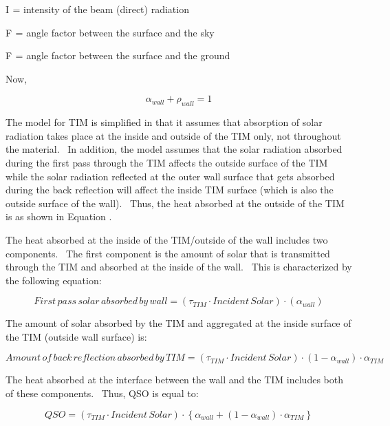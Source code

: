 I\(_{ }\) = intensity of the beam (direct) radiation

F\(_{ }\) = angle factor between the surface and the sky

F\(_{ }\) = angle factor between the surface and the ground

Now,

\begin{equation}
{\alpha_{wall}} + {\rho_{wall}} = 1
\end{equation}

The model for TIM is simplified in that it assumes that absorption of solar radiation takes place at the inside and outside of the TIM only, not throughout the material.~ In addition, the model assumes that the solar radiation absorbed during the first pass through the TIM affects the outside surface of the TIM while the solar radiation reflected at the outer wall surface that gets absorbed during the back reflection will affect the inside TIM surface (which is also the outside surface of the wall).~ Thus, the heat absorbed at the outside of the TIM is as shown in Equation .

The heat absorbed at the inside of the TIM/outside of the wall includes two components.~ The first component is the amount of solar that is transmitted through the TIM and absorbed at the inside of the wall.~ This is characterized by the following equation:

\begin{equation}
First\,pass\,solar\,absorbed\,by\,wall = \left( {{\tau_{TIM}}\cdot Incident\,Solar} \right)\cdot \left( {{\alpha_{wall}}} \right)
\end{equation}

The amount of solar absorbed by the TIM and aggregated at the inside surface of the TIM (outside wall surface) is:

\begin{equation}
Amount\,of\,back\,reflection\,absorbed\,by\,TIM = \left( {{\tau_{TIM}}\cdot Incident\,Solar} \right)\cdot \left( {1 - {\alpha_{wall}}} \right)\cdot {\alpha_{TIM}}
\end{equation}

The heat absorbed at the interface between the wall and the TIM includes both of these components.~ Thus, QSO is equal to:

\begin{equation}
QSO = \left( {{\tau_{TIM}}\cdot Incident\,Solar} \right)\cdot \left\{ {{\alpha_{wall}} + \left( {1 - {\alpha_{wall}}} \right)\cdot \alpha {}_{TIM}} \right\}
\end{equation}

